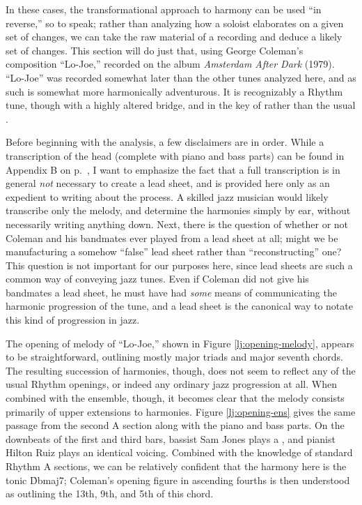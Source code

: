 In these cases, the transformational approach to harmony can be used ``in
reverse,'' so to speak; rather than analyzing how a soloist elaborates on a
given set of changes, we can take the raw material of a recording and deduce a
likely set of changes. This section will do just that, using George Coleman's
composition ``Lo-Joe,'' recorded on the album \emph{Amsterdam After Dark}
(1979). ``Lo-Joe'' was recorded somewhat later than the other tunes
analyzed here, and as such is somewhat more harmonically adventurous. It is
recognizably a Rhythm tune, though with a highly altered bridge, and in the
key of \Dflat rather than the usual \Bflat.

Before beginning with the analysis, a few disclaimers are in order. While a
transcription of the head (complete with piano and bass parts) can be found in
Appendix B on p.~\pageref{transcription:lo-joe}, I want to emphasize the fact
that a full transcription is in general \emph{not} necessary to create a lead
sheet, and is provided here only as an expedient to writing about the process.
A skilled jazz musician would likely transcribe only the melody, and determine
the harmonies simply by ear, without necessarily writing anything down. Next,
there is the question of whether or not Coleman and his bandmates ever played
from a lead sheet at all; might we be manufacturing a somehow ``false'' lead
sheet rather than ``reconstructing'' one? This question is not important for
our purposes here, since lead sheets are such a common way of conveying jazz
tunes. Even if Coleman did not give his bandmates a lead sheet, he must have
had \emph{some} means of communicating the harmonic progression of the tune,
and a lead sheet is the canonical way to notate this kind of progression in
jazz.

The opening of melody of ``Lo-Joe,'' shown in Figure \ref{lj:opening-melody},
appears to be straightforward, outlining mostly major triads and major seventh
chords. The resulting succession of harmonies, though, does not seem to
reflect any of the usual Rhythm openings, or indeed any ordinary jazz
progression at all. When combined with the ensemble, though, it becomes clear
that the melody consists primarily of upper extensions to harmonies.
Figure \ref{lj:opening-ens} gives the same passage from the second A section
along with the piano and bass parts. On the downbeats of the first
and third bars, bassist Sam Jones plays a \Dflat, and pianist Hilton Ruiz
plays an identical voicing. Combined with the knowledge of standard Rhythm A
sections, we can be relatively confident that the harmony here is the tonic
\h{Dbmaj7}; Coleman's opening figure in ascending fourths is then understood
as outlining the 13th, 9th, and 5th of this chord.

